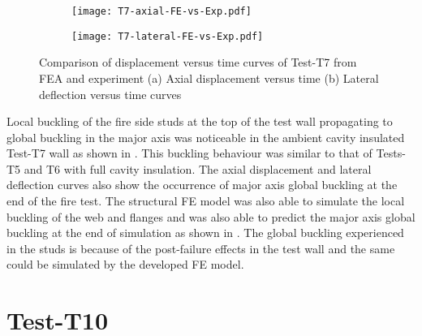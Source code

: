 \begin{figure}[!htbp]
	\centering
	\begin{subfigure}[b]{0.7\textwidth}
		\centering
		\texttt{[image: T7-axial-FE-vs-Exp.pdf]}
		\caption{}
		\label{subfig:T7-axial-FE-vs-Exp}
	\end{subfigure}
	\begin{subfigure}[b]{0.7\textwidth}
		\centering
		\texttt{[image: T7-lateral-FE-vs-Exp.pdf]}
		\caption{}
		\label{subfig:T7-lateral-FE-vs-Exp}
	\end{subfigure}
	   \caption{Comparison of displacement versus time curves of Test-T7 from FEA and experiment (a) Axial displacement versus time (b) Lateral deflection versus time curves}
	   \label{fig:T7-structural-FE-vs-Exp}
\end{figure} 

Local buckling of the fire side studs at the top of the test wall propagating to global buckling in the major axis was noticeable in the ambient cavity insulated Test-T7 wall as shown in . This buckling behaviour was similar to that of Tests-T5 and T6 with full cavity insulation.  The axial displacement and lateral deflection curves also show the occurrence of major axis global buckling at the end of the fire test. The structural FE model was also able to simulate the local buckling of the web and flanges and was also able to predict the major axis global buckling at the end of simulation as shown in . The global buckling experienced in the studs is because of the post-failure effects in the test wall and the same could be simulated by the developed FE model.

\section*{Test-T10}

